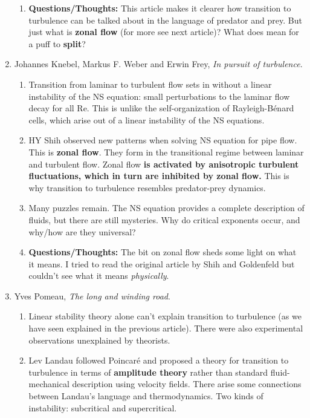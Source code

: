 \documentclass[11pt]{article}
\begin{document}
\begin{enumerate}
\begin{enumerate}
		\item \textbf{Questions/Thoughts:} This article makes it clearer how transition to turbulence can be talked about in the language of predator and prey. But just what is \textbf{zonal flow} (for more see next article)? What does mean for a puff to \textbf{split}?
	\end{enumerate}
	
	
	\item Johannes Knebel, Markus F. Weber and Erwin Frey, \textit{In pursuit of turbulence}.
	\begin{enumerate}
		\item  Transition from laminar to turbulent flow sets in without a linear instability of the NS equation: small perturbations to the laminar flow decay for all Re. This
		is unlike the self-organization of Rayleigh-B\'{e}nard cells, which arise out of a linear instability of the NS equations.
		
		\item HY Shih observed new patterns when solving NS equation for pipe flow. This is \textbf{zonal flow}. They form in the transitional regime between
		laminar and turbulent flow. Zonal flow \textbf{is activated by anisotropic turbulent fluctuations, which in turn are inhibited by zonal flow.} This is why transition to turbulence resembles predator-prey dynamics.
		
		\item Many puzzles remain. The NS equation provides a complete description of fluids, but there are still mysteries. Why do critical exponents occur, and why/how are they universal? 
		
		
		\item \textbf{Questions/Thoughts:} The bit on zonal flow sheds some light on what it means. I tried to read the original article by Shih and Goldenfeld but couldn't see what it means \textit{physically}. 
	\end{enumerate}
	
	
	\item Yves Pomeau, \textit{The long and winding road}.
	\begin{enumerate}
		\item Linear stability theory alone can't explain transition to turbulence (as we have seen explained in the previous article). There were also experimental observations unexplained by theorists.
		
		\item Lev Landau followed Poincar\'{e} and proposed a theory for transition to turbulence in terms of \textbf{amplitude theory} rather than standard fluid-mechanical description using velocity fields. There arise some connections between Landau's language and thermodynamics. Two kinds of instability: subcritical and supercritical. 
		

\end{enumerate}
\end{enumerate}
\end{document}
